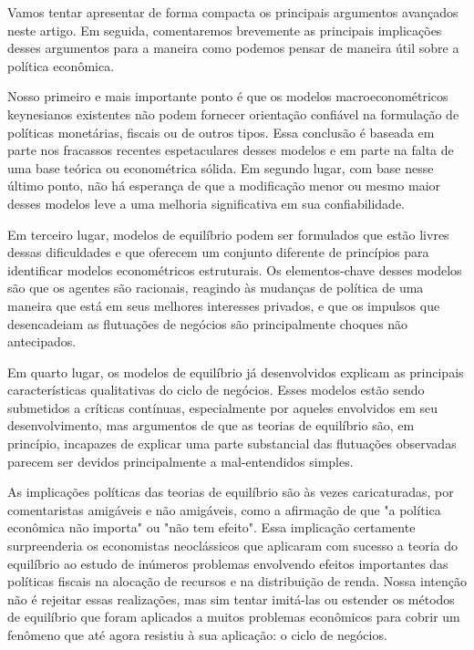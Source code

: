 \documentclass[12pt]{article}
\begin{document}
Vamos tentar apresentar de forma compacta os principais argumentos avançados neste artigo. Em seguida, comentaremos brevemente as principais implicações desses argumentos para a maneira como podemos pensar de maneira útil sobre a política econômica.

Nosso primeiro e mais importante ponto é que os modelos macroeconométricos keynesianos existentes não podem fornecer orientação confiável na formulação de políticas monetárias, fiscais ou de outros tipos. Essa conclusão é baseada em parte nos fracassos recentes espetaculares desses modelos e em parte na falta de uma base teórica ou econométrica sólida. Em segundo lugar, com base nesse último ponto, não há esperança de que a modificação menor ou mesmo maior desses modelos leve a uma melhoria significativa em sua confiabilidade.

Em terceiro lugar, modelos de equilíbrio podem ser formulados que estão livres dessas dificuldades e que oferecem um conjunto diferente de princípios para identificar modelos econométricos estruturais. Os elementos-chave desses modelos são que os agentes são racionais, reagindo às mudanças de política de uma maneira que está em seus melhores interesses privados, e que os impulsos que desencadeiam as flutuações de negócios são principalmente choques não antecipados.

Em quarto lugar, os modelos de equilíbrio já desenvolvidos explicam as principais características qualitativas do ciclo de negócios. Esses modelos estão sendo submetidos a críticas contínuas, especialmente por aqueles envolvidos em seu desenvolvimento, mas argumentos de que as teorias de equilíbrio são, em princípio, incapazes de explicar uma parte substancial das flutuações observadas parecem ser devidos principalmente a mal-entendidos simples.

As implicações políticas das teorias de equilíbrio são às vezes caricaturadas, por comentaristas amigáveis e não amigáveis, como a afirmação de que "a política econômica não importa" ou "não tem efeito". Essa implicação certamente surpreenderia os economistas neoclássicos que aplicaram com sucesso a teoria do equilíbrio ao estudo de inúmeros problemas envolvendo efeitos importantes das políticas fiscais na alocação de recursos e na distribuição de renda. Nossa intenção não é rejeitar essas realizações, mas sim tentar imitá-las ou estender os métodos de equilíbrio que foram aplicados a muitos problemas econômicos para cobrir um fenômeno que até agora resistiu à sua aplicação: o ciclo de negócios.
\end{document}
